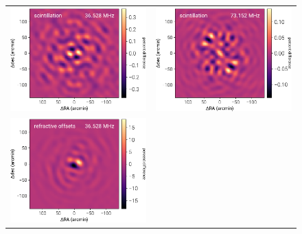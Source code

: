 \begin{bibunit}
\begin{figure}[t]
    \centering
    \begin{tabular}{cc}
        \includegraphics[width=\columnwidth]{figures/chapter3/scintillation-4} &
        \includegraphics[width=\columnwidth]{figures/chapter3/scintillation-18} \\
        \includegraphics[width=\columnwidth]{figures/chapter3/refraction-4} &

\end{tabular}
\end{figure}
\end{bibunit}
